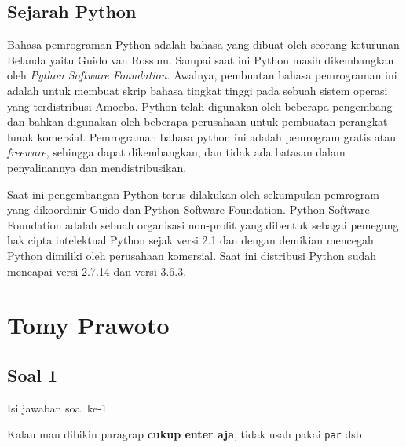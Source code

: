 \subsection{Sejarah Python}
Bahasa pemrograman Python adalah bahasa yang dibuat oleh seorang keturunan Belanda yaitu Guido van Rossum. Sampai saat ini Python masih dikembangkan oleh \textit{Python Software Foundation}. Awalnya, pembuatan bahasa pemrograman ini adalah untuk membuat skrip bahasa tingkat tinggi pada sebuah sistem operasi yang terdistribusi Amoeba. Python telah digunakan oleh beberapa pengembang dan bahkan digunakan oleh beberapa perusahaan untuk pembuatan perangkat lunak komersial. Pemrograman bahasa python ini adalah pemrogram gratis atau \textit{freeware}, sehingga dapat dikembangkan, dan tidak ada batasan dalam penyalinannya dan mendistribusikan.

Saat ini pengembangan Python terus dilakukan oleh sekumpulan pemrogram yang dikoordinir Guido dan Python Software Foundation. Python Software Foundation adalah sebuah organisasi non-profit yang dibentuk sebagai pemegang hak cipta intelektual Python sejak versi 2.1 dan dengan demikian mencegah Python dimiliki oleh perusahaan komersial. Saat ini distribusi Python sudah mencapai versi 2.7.14 dan versi 3.6.3.


\section{Tomy Prawoto}
\subsection{Soal 1}
Isi jawaban soal ke-1

Kalau mau dibikin paragrap \textbf{cukup enter aja}, tidak usah pakai \verb|par| dsb


